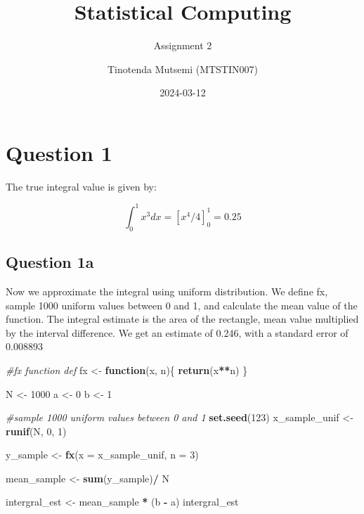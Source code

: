 \documentclass[
]{article}
\title{Statistical Computing}
\subtitle{Assignment 2}
\author{Tinotenda Mutsemi (MTSTIN007)}
\date{2024-03-12}
\newenvironment{Shaded}{\begin{snugshade}}{\end{snugshade}}
\newcommand{\AttributeTok}[1]{\textcolor[rgb]{0.13,0.29,0.53}{#1}}
\newcommand{\CommentTok}[1]{\textcolor[rgb]{0.56,0.35,0.01}{\textit{#1}}}
\newcommand{\ControlFlowTok}[1]{\textcolor[rgb]{0.13,0.29,0.53}{\textbf{#1}}}
\newcommand{\DecValTok}[1]{\textcolor[rgb]{0.00,0.00,0.81}{#1}}
\newcommand{\FunctionTok}[1]{\textcolor[rgb]{0.13,0.29,0.53}{\textbf{#1}}}
\newcommand{\NormalTok}[1]{#1}
\newcommand{\OtherTok}[1]{\textcolor[rgb]{0.56,0.35,0.01}{#1}}
\newcommand{\SpecialCharTok}[1]{\textcolor[rgb]{0.81,0.36,0.00}{\textbf{#1}}}
\begin{document}
\maketitle

\hypertarget{question-1}{%
\section{Question 1}\label{question-1}}

The true integral value is given by:

\[ \int_0^1x^3dx = [x^4/4]_0^1 = 0.25 \]

\hypertarget{question-1a}{%
\subsection{Question 1a}\label{question-1a}}

Now we approximate the integral using uniform distribution. We define
fx, sample 1000 uniform values between 0 and 1, and calculate the mean
value of the function. The integral estimate is the area of the
rectangle, mean value multiplied by the interval difference. We get an
estimate of 0.246, with a standard error of 0.008893

\begin{Shaded}
\begin{Highlighting}[]
\CommentTok{\#fx function def}
\NormalTok{fx }\OtherTok{\textless{}{-}} \ControlFlowTok{function}\NormalTok{(x, n)\{}
  \FunctionTok{return}\NormalTok{(x}\SpecialCharTok{**}\NormalTok{n)}
\NormalTok{\}}


\NormalTok{N }\OtherTok{\textless{}{-}} \DecValTok{1000}
\NormalTok{a }\OtherTok{\textless{}{-}} \DecValTok{0}
\NormalTok{b }\OtherTok{\textless{}{-}} \DecValTok{1}
\end{Highlighting}
\end{Shaded}

\begin{Shaded}
\begin{Highlighting}[]
\CommentTok{\#sample 1000 uniform values between 0 and 1}
\FunctionTok{set.seed}\NormalTok{(}\DecValTok{123}\NormalTok{)}
\NormalTok{x\_sample\_unif }\OtherTok{\textless{}{-}} \FunctionTok{runif}\NormalTok{(N, }\DecValTok{0}\NormalTok{, }\DecValTok{1}\NormalTok{)}

\NormalTok{y\_sample }\OtherTok{\textless{}{-}} \FunctionTok{fx}\NormalTok{(}\AttributeTok{x =}\NormalTok{ x\_sample\_unif, }\AttributeTok{n =} \DecValTok{3}\NormalTok{)}

\NormalTok{mean\_sample }\OtherTok{\textless{}{-}} \FunctionTok{sum}\NormalTok{(y\_sample)}\SpecialCharTok{/}\NormalTok{ N}

\NormalTok{intergral\_est }\OtherTok{\textless{}{-}}\NormalTok{ mean\_sample }\SpecialCharTok{*}\NormalTok{ (b }\SpecialCharTok{{-}}\NormalTok{ a)}
\NormalTok{intergral\_est}
\end{Highlighting}
\end{Shaded}
\end{document}
